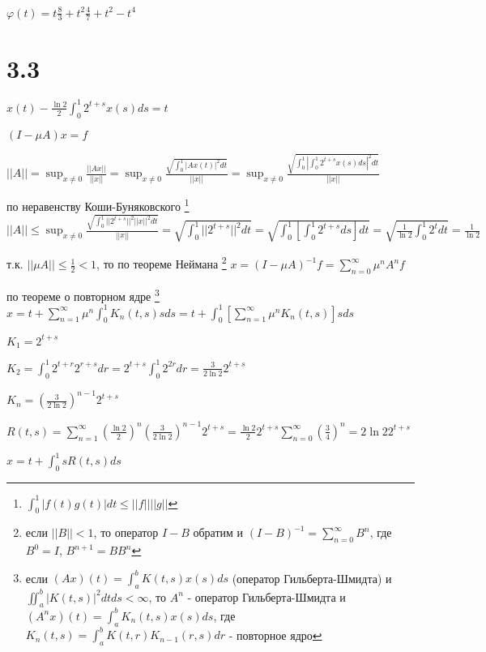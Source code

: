 \documentclass[russian]{article}
\begin{document}
$\varphi(t) = t \frac{8}{3} + t^2 \frac{4}{7} + t^2 - t^4$

\section*{3.3}

$x(t) - \frac{\ln 2}{2}\int_0^1 2^{t+s} x(s) ds = t$

$(I-\mu A)x = f$

$||A||=\sup_{x \ne 0} \frac{||Ax||}{||x||} = \sup_{x \ne 0} \frac{\sqrt{\int_0^1 |Ax(t)|^2 dt}}{||x||}=\sup_{x \ne 0} \frac{\sqrt{\int_0^1 |\int_0^1 2^{t+s}x(s)ds|^2 dt}}{||x||}$ 

по неравенству Коши-Буняковского \footnote{
	$\int_0^1|f(t) g(t)| dt \le ||f|| ||g|| $
}
$||A|| \le \sup_{x \ne 0} \frac{\sqrt{\int_0^1 ||2^{t+s}||^2 ||x||^2 dt}}{||x||} = \sqrt{\int_0^1 ||2^{t+s}||^2 dt} = \sqrt{\int_0^1 [\int_0^1 2^{t+s} ds]dt} =\sqrt{\frac{1}{\ln 2} \int_0^1 2^t dt} = \frac{1}{\ln 2}$

т.к. $||\mu A|| \le \frac{1}{2} < 1$, то по теореме Неймана \footnote{
	если $||B|| < 1$, то оператор $I-B$ обратим и $(I-B)^{-1} = \sum _{n=0}^\infty B^n$, где $B^0 = I$, $B^{n+1} = B B^n$
}
$x=(I-\mu A)^{-1}f=\sum_{n=0}^{\infty}\mu^n A^n f$

по теореме о повторном ядре \footnote{
	если $(Ax)(t)=\int_a^bK(t,s)x(s)ds$ (оператор Гильберта-Шмидта)
	и $\iint_{a}^{b}|K(t,s)|^2 dt ds < \infty$, то $A^n$ - оператор Гильберта-Шмидта 
	и $(A^n x)(t) = \int_a^b K_n(t,s)x(s) ds$, где $K_n(t,s) = \int_a^b K(t,r) K_{n-1}(r,s)dr$ - повторное ядро
} $x=t + \sum_{n=1}^{\infty}\mu^n \int_0^1 K_n(t,s)s ds=t+\int_0^1[\sum_{n=1}^\infty \mu ^n K_n(t,s)]s ds$

$K_1 = 2^{t+s}$

$K_2 = \int_0^1 2^{t+r} 2^{r+s} dr = 2^{t+s} \int_0^1 2^{2r} dr = \frac{3}{2 \ln 2} 2^{t+s}$

$K_n = (\frac{3}{2 \ln 2})^{n-1} 2^{t+s} $

$R(t,s) = \sum_{n=1}^\infty (\frac{\ln 2}{2})^n (\frac{3}{2 \ln 2})^{n-1} 2^{t+s} = \frac{\ln 2}{2} 2^{t+s} \sum_{n=0}^\infty (\frac{3}{4})^n = 2 \ln 2 2^{t+s}$

$x=t+\int_0^1 s R(t,s) ds$
\end{document}
